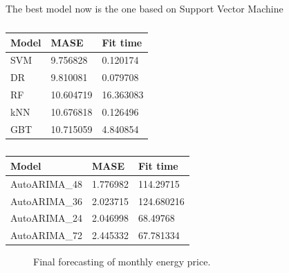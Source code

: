 The best model now is the one based on Support Vector Machine

\begin{table}[H]
\centering
\begin{tabular}{l|l|l}
\hline
Model & MASE      & Fit time  \\ \hline
SVM   & 9.756828  & 0.120174  \\
DR    & 9.810081  & 0.079708  \\
RF    & 10.604719 & 16.363083 \\
kNN   & 10.676818 & 0.126496  \\
GBT   & 10.715059 & 4.840854  \\ \hline
\end{tabular}
\caption{}
\label{tab:cv-daily}
\end{table}

\begin{table}[]
\centering
\begin{tabular}{@{}l|l|l@{}}
\toprule
Model         & MASE     & Fit time   \\ \midrule
AutoARIMA\_48 & 1.776982 & 114.29715  \\
AutoARIMA\_36 & 2.023715 & 124.680216 \\
AutoARIMA\_24 & 2.046998 & 68.49768   \\
AutoARIMA\_72 & 2.445332 & 67.781334  \\ \bottomrule
\end{tabular}
\caption{}
\label{tab:arima-monthly}
\end{table}

\begin{figure}[H]
\centering
    \caption{Final forecasting of monthly energy price.}
    \label{fig:forecast-arima-monthly}
\end{figure}

